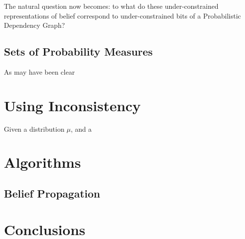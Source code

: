 \documentclass{article}
\newcommand{\modelname}{Probabilistic Dependency Graph}
\begin{document}
	The natural question now becomes: to what do these under-constrained representations of belief correspond to under-constrained bits of a \modelname?
	
	\subsection{Sets of Probability Measures}
	As may have been clear 
	
	
	
	\section{Using Inconsistency}
	
	Given a distribution $\mu$, and a 
	
	\section{Algorithms}
	\subsection{Belief Propagation}
	
	\section{Conclusions}
\end{document}
